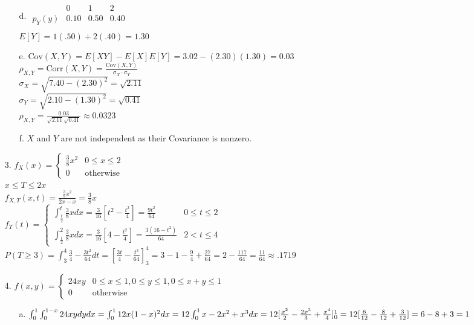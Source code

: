 \documentclass[11pt]{amsart}
\theoremstyle{definition}
\begin{document}
\begin{itemize}
\begin{itemize}
    \item[d.]
$\begin{array}{c|ccc}
        & 0    & 1    & 2    \\\hline
p_Y(y)  & 0.10 & 0.50 & 0.40 \\
\end{array}$\\
$E[Y]=1(.50)+2(.40)=1.30$
    
    \item[e.] $\text{Cov}(X,Y)=E[XY]-E[X]E[Y]=3.02-(2.30)(1.30)=0.03$ \\
              $\rho_{X,Y}=\text{Corr}(X,Y)=\frac{\text{Cov}(X,Y)}{\sigma_X\cdot \sigma_Y}$ \\
              $\sigma_X=\sqrt{7.40-(2.30)^2}=\sqrt{2.11}$ \\
              $\sigma_Y=\sqrt{2.10-(1.30)^2}=\sqrt{0.41}$ \\
              $\rho_{X,Y}=\frac{0.03}{\sqrt{2.11}\sqrt{0.41}}\approx 0.0323$
              
    
    \item[f.] $X$ and $Y$ are not independent as their Covariance is nonzero.
    
\end{itemize}

\item[3.] $f_X(x)=\begin{cases}
    \frac 38x^2 &0\le x\le 2 \\
    0 &\text{otherwise}
\end{cases}$ \\
$x\le T\le 2x$ \\
$f_{X,T}(x,t)=\frac{\frac 38x^2}{2x-x}=\frac 38x$ \\
$f_T(t)=\begin{cases}
    \int_{\frac t2}^t\frac 38xdx=\frac 3{16}[t^2-\frac{t^2}4]=\frac{9t^2}{64} &0\le t\le 2 \\
    \int_{\frac t2}^2\frac 38xdx=\frac 3{16}[4-\frac{t^2}4]=\frac{3(16-t^2)}{64} &2< t\le 4
\end{cases}$ \\
$P(T\ge 3)=\int_3^4\frac34-\frac{3t^2}{64}dt=[\frac{3t}4-\frac{t^3}{64}]_3^4=3-1-\frac94+\frac{27}{64}=2-\frac{117}{64}=\frac{11}{64}\approx.1719$

\item[4.] $f(x,y)=\begin{cases}
    24xy &0\le x\le1,0\le y\le 1,0\le x+y\le 1 \\
    0 &\text{otherwise}
\end{cases}$
\begin{itemize}
    \item[a.] $\int_0^1\int_0^{1-x}24xydydx=\int_0^112x(1-x)^2 dx=12\int_0^1x-2x^2+x^3dx\\
              =12[\frac{x^2}2-\frac{2x^3}3+\frac{x^4}4]_0^1=12[\frac6{12}-\frac8{12}+\frac3{12}]=6-8+3=1$


\end{itemize}
\end{itemize}
\end{document}
